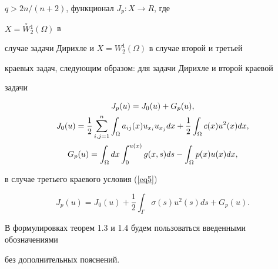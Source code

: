 $q>2n/(n+2)$, функционал $ J_p :X \to R $, где


$ X= \overset{\circ}{W}{}_{2}^{1}(\Omega)$ в


случае задачи Дирихле и $X=W_{2}^{1}(\Omega)$ в случае второй и третьей


краевых задач, следующим образом: для задачи Дирихле и второй краевой


задачи


\begin{gather}


J_p(u)=J_0(u)+G_p(u),\notag \\


%


J_0(u)=\frac{1}{2} \sum\limits_{i,j=1}^n \int_\Omega a_{ij}(x)u_


{x_{i}}u_{x_{j}}dx+\frac{1}{2} \int_\Omega c(x)u^2(x)dx, \notag \\


%


G_p(u)=\int_\Omega dx \int_0^{u(x)} g(x,s)ds


-\int_\Omega p(x)u(x)dx,


\label{eq1.7}


\end{gather}


в случае третьего краевого условия (\ref{eq5})


\begin{equation}


J_p(u)=J_0(u)+\frac12\int_\Gamma \sigma (s)u^2(s)ds+G_p(u).


\label{(1.8)}


\end{equation}


В формулировках теорем 1.3 и 1.4 будем пользоваться введенными обозначениями


без дополнительных пояснений.





